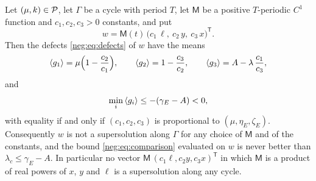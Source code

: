\begin{proposition}\label{prop:nomonomial}
Let $(\mu,k)\in\mathcal P$, let $\Gamma$ be a cycle with period $T$, let $\mathsf M$ be a positive $T$-periodic $C^1$ function and $c_1,c_2,c_3>0$ constants, and put
\[
w=\mathsf M(t)\,\bigl(c_1\,\ell,\ c_2\,y,\ c_3\,x\bigr)^{\mathsf T}.
\]
Then the defects \eqref{neg:eq:defects} of $w$ have the means
\begin{equation}\label{neg:eq:monomialdefects}
\left\langle g_1\right\rangle=\mu\Bigl(1-\frac{c_2}{c_1}\Bigr),\qquad
\left\langle g_2\right\rangle=1-\frac{c_3}{c_2},\qquad
\left\langle g_3\right\rangle=A-\lambda\,\frac{c_1}{c_3},
\end{equation}
and
\begin{equation}\label{neg:eq:monomialbound}
\min_i\left\langle g_i\right\rangle\le-(\gamma_E-A)<0 ,
\end{equation}
with equality if and only if $(c_1,c_2,c_3)$ is proportional to $(\mu,\eta_E,\zeta_E)$. Consequently $w$ is not a supersolution along $\Gamma$ for any choice of $\mathsf M$ and of the constants, and the bound \eqref{neg:eq:comparison} evaluated on $w$ is never better than $\lambda_c\le\gamma_E-A$. In particular no vector $\mathsf M\,(c_1\ell,c_2y,c_3x)^{\mathsf T}$ in which $\mathsf M$ is a product of real powers of $x$, $y$ and $\ell$ is a supersolution along any cycle.
\end{proposition}
